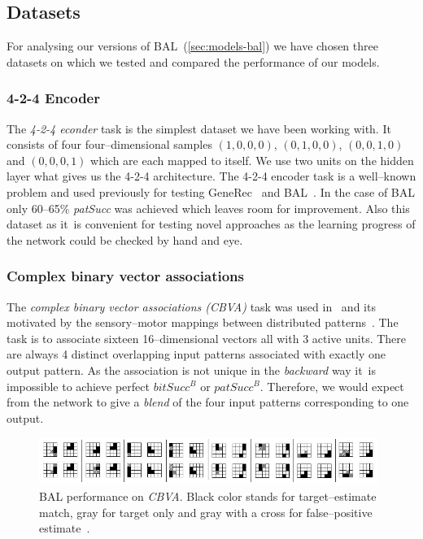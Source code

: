 
\subsection{Datasets}  
\label{sec:sim-data} 

For analysing our versions of BAL~(\ref{sec:models-bal}) we have chosen three datasets on which we tested and compared the performance of our models. 

\subsubsection{4-2-4 Encoder} 
\label{sec:datasets-auto4}


The \emph{4-2-4 econder} task is the simplest dataset we have been working with. It consists of four four--dimensional samples $(1,0,0,0)$, $(0,1,0,0)$, $(0,0,1,0)$ and $(0,0,0,1)$ which are each mapped to itself. We use two units on the hidden layer what gives us the 4-2-4 architecture. The 4-2-4 encoder task is a well--known problem and used previously for testing GeneRec~\citep{o1996bio} and BAL~\citep{farkas2013bal}. In the case of BAL only 60--65\% \emph{patSucc} was achieved which leaves room for improvement. Also this dataset as it~is convenient for testing novel approaches as the learning progress of the network could be checked by hand and eye. 

\subsubsection{Complex binary vector associations} 
\label{sec:datasets-k3}

The \emph{complex binary vector associations (CBVA)} task was used in~\citet{farkas2013bal} and its motivated by the sensory--motor mappings between distributed patterns~\citep{farkas2013bal}. The task is to associate sixteen 16--dimensional vectors all with 3 active units. There are always 4 distinct overlapping input patterns associated with exactly one output pattern. As the association is not unique in the \emph{backward} way it~is impossible to achieve perfect $bitSucc^B$ or $patSucc^B$. Therefore, we would expect from the network to give a \emph{blend} of the four input patterns corresponding to one output. 

\begin{figure}[H]
  \centering
  \includegraphics[width=0.98\textwidth]{img/datasets-k3.png} 
  \caption{BAL performance on \emph{CBVA}. Black color stands for target--estimate match, gray for target only and gray with a cross for false--positive estimate~\citep{farkas2013bal}.}
  \label{fig:datasets-k3}
\end{figure}

